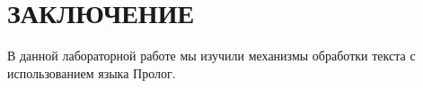 \section*{ЗАКЛЮЧЕНИЕ}

В данной лабораторной работе мы изучили механизмы обработки
текста с использованием языка Пролог.

\newpage
